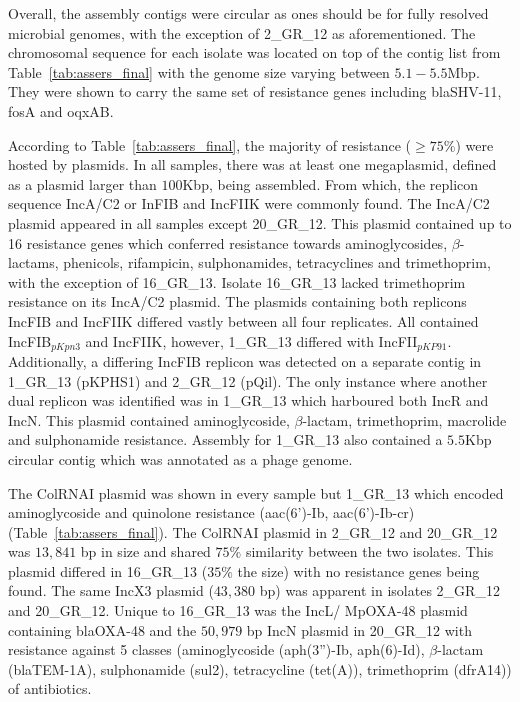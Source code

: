 Overall, the assembly contigs were circular as ones should be for fully resolved microbial genomes, with the exception of 2\_GR\_12 as aforementioned. 
The chromosomal sequence for each isolate was located on top of the contig list from Table~\ref{tab:assers_final} with the genome size varying between $5.1-5.5$Mbp. They were shown to carry the same set of resistance genes including blaSHV-11, fosA and oqxAB. 


According to Table~\ref{tab:assers_final}, the majority of resistance ($\geq 75\%$) were hosted by plasmids.
In all samples, there was at least one megaplasmid, defined as a plasmid larger than $100$Kbp, being assembled. From which, the replicon sequence IncA/C2 or InFIB and IncFIIK were commonly found.
The IncA/C2 plasmid appeared in all samples except 20\_GR\_12. 
This plasmid contained up to 16 resistance genes which conferred resistance towards aminoglycosides, $\beta$-lactams, phenicols, rifampicin, sulphonamides, tetracyclines and trimethoprim, with the exception of 16\_GR\_13. Isolate 16\_GR\_13 lacked trimethoprim resistance on its IncA/C2 plasmid. 
The plasmids containing both replicons IncFIB and IncFIIK differed vastly between all four replicates. 
All contained IncFIB$_{pKpn3}$ and IncFIIK, however, 1\_GR\_13 differed with IncFII$_{pKP91}$. Additionally, a differing IncFIB replicon was detected on a separate contig in 1\_GR\_13 (pKPHS1) and 2\_GR\_12 (pQil). 
The only instance where another dual replicon was identified was in 1\_GR\_13 which harboured both IncR and IncN. 
This plasmid contained aminoglycoside, $\beta$-lactam, trimethoprim, macrolide and sulphonamide resistance. 
Assembly for 1\_GR\_13 also contained a $5.5$Kbp circular contig which was annotated as a phage genome.

The ColRNAI plasmid was shown in every sample but 1\_GR\_13 which encoded aminoglycoside and quinolone resistance (aac(6')-Ib, aac(6')-Ib-cr) (Table~\ref{tab:assers_final}).
The ColRNAI plasmid in 2\_GR\_12 and 20\_GR\_12 was $13,841$ bp in size and shared $75\%$ similarity between the two isolates. This plasmid differed in 16\_GR\_13 ($35\%$ the size) with no resistance genes being found. 
The same IncX3 plasmid ($43,380$ bp) was apparent in isolates 2\_GR\_12 and 20\_GR\_12.
Unique to 16\_GR\_13 was the IncL/ MpOXA-48 plasmid containing blaOXA-48 and the $50,979$ bp IncN plasmid in 20\_GR\_12 with resistance against 5 classes (aminoglycoside (aph(3'')-Ib, aph(6)-Id), $\beta$-lactam (blaTEM-1A), sulphonamide (sul2), tetracycline (tet(A)), trimethoprim (dfrA14)) of antibiotics.

